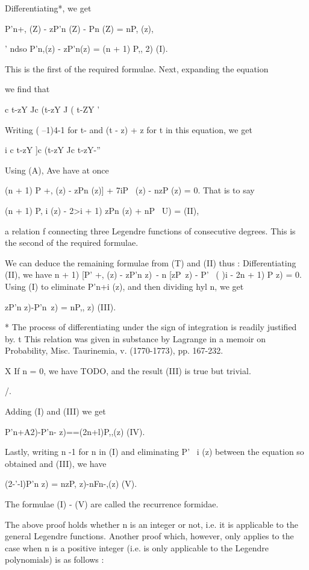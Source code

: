 {Differentiating*, we get

P'n+, (Z) - zP'n (Z) - Pn (Z) = nP, (z),

' ndso P'n,(z) - zP'n(z) = (n + 1) P,, 2) (I).

This is the first of the required formulae. Next, expanding the
equation

we find that

c t-zY Jc (t-zY J ( t-ZY '

Writing ( --1)4-1 for t- and (t - z) + z for t in this equation, we
get

 i c t-zY ]c (t-zY Jc t-zY-''

Using (A), Ave have at once

(n + 1) P +, (z) - zPn (z)] + 7iP \, (z) - nzP (z) = 0. That is to
say

(n + 1) P, i (z) - 2>i + 1) zPn (z) + nP \, U) = (II),

a relation f connecting three Legendre functions of consecutive
degrees. This is the second of the required formulae.

We can deduce the remaining formulae from (T) and (II) thus :
Differentiating (II), we have n + 1) [P' +, (z) - zP'n z)\ - n [zP\ z)
- P' \, ( )i - 2n + 1) P z) = 0. Using (I) to eliminate P'n+i (z),
and then dividing hyl n, we get

zP'n z)-P'n\, z) = nP,, z) (III).

* The process of differentiating under the sign of integration is
readily justified by. t This relation was given in substance by
Lagrange in a memoir on Probability, Misc. Taurinemia, v. (1770-1773),
pp. 167-232.

X If n = 0, we have TODO, and the result (III) is
true but trivial.

/.

%
%

Adding (I) and (III) we get

P'n+A2)-P'n- z)==(2n+l)P,,(z) (IV).

Lastly, writing n -1 for n in (I) and eliminating P' \ i (z) between
the equation so obtained and (III), we have

(2-'-l)P'n z) = nzP, z)-nFn-,(z) (V).

The formulae (I) - (V) are called the recurrence formidae.

The above proof holds whether n is an integer or not, i.e. it is
applicable to the general Legendre functions. Another proof which,
however, only applies to the case when n is a positive integer (i.e.
is only applicable to the Legendre polynomials) is as follows :

}
